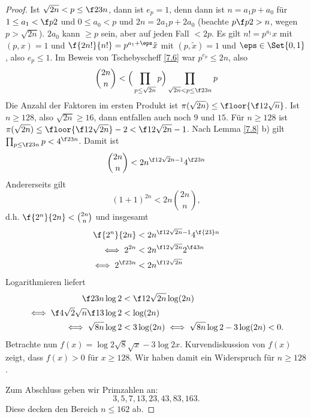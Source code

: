\begin{st}
\begin{proof}
		Ist $\sqrt{2n} < p \le \f 23 n$, dann ist $e_p = 1$, denn dann ist $n = a_1 p + a_0$ für $1 \le a_1 < \f p2$ und $0 \le a_0 < p$ und $2n = 2a_1 p + 2a_0$ (beachte $p \f p2 > n$, wegen $p > \sqrt{2n}$).
		$2 a_0$ kann $\ge p$ sein, aber auf jeden Fall $< 2p$.
		Es gilt $n! = p^{a_1} x$ mit $(p,x) = 1$ und $\f {2n!}{n!} = p^{a_1 + \eps} \tilde x$ mit $(p, \tilde x) = 1$ und $\eps \in \Set{0, 1}$, also $e_p \le 1$.
		Im Beweis von Tschebyscheff \ref{7.6} war $p^{e_p} \le 2n$, also
		\[
			\binom{2n}{n}
			< \Big(\prod_{p \le \sqrt{2n}} p \Big) \prod_{\sqrt{2n} < p \le \f 23 n} p
		\]
		Die Anzahl der Faktoren im ersten Produkt ist $\pi(\sqrt{2n}) \le \floor{\f 12 \sqrt n}$.
		Ist $n \ge 128$, also $\sqrt{2n} \ge 16$, dann entfallen auch noch $9$ und $15$.
		Für $n \ge 128$ ist $\pi(\sqrt{2n}) \le \floor{\f 12 \sqrt{2n}} - 2 < \f 12 \sqrt{2n} - 1$.
		Nach Lemma \ref{7.8} b) gilt $\prod_{p \le \f 23 n} p < 4^{\f 23 n}$.
		Damit ist
		\[
			\binom{2n}{n} < 2 n^{\f 12 \sqrt 2n - 1} 4^{\f 23 n}
		\]
		Andererseits gilt
		\[
			(1 + 1)^{2n}
			< 2n \binom{2n}{n},
		\]
		d.h. $\f{2^n}{2n} < \binom{2n}{n}$ und insgesamt
		\begin{align*}
			\f{2^n}{2n} &< 2n^{\f 12 \sqrt{2n} - 1} 4^{\f{23}n} \\
			\iff 2^{2n} &< 2n^{\f 12 \sqrt{2n}} 2^{\f 43 n} \\
			\iff 2^{\f 23 n} &< 2n^{\f 12 \sqrt{2n}}
		\end{align*}
		Logarithmieren liefert
		\begin{align*}
			\f 23 n \log 2 &< \f 12 \sqrt{2n} \log(2n) \\
			\iff \f 4{\sqrt 2} \sqrt n \f 13 \log 2 &< \log(2n) \\
			\iff \sqrt{8n} \log 2 &< 3 \log(2n)
			\iff \sqrt{8n} \log 2 - 3 \log(2n) < 0.
		\end{align*}
		Betrachte nun $f(x) = \log 2 \sqrt{8} \sqrt{x} - 3 \log 2x$.
		Kurvendiskussion von $f(x)$ zeigt, dass $f(x) > 0$ für $x \ge 128$.
		Wir haben damit ein Widerspruch für $n \ge 128$.

		Zum Abschluss geben wir Primzahlen an:
		\[
			3, 5, 7, 13, 23, 43, 83, 163.
		\]
		Diese decken den Bereich $n \le 162$ ab.
	\end{proof}
\end{st}

